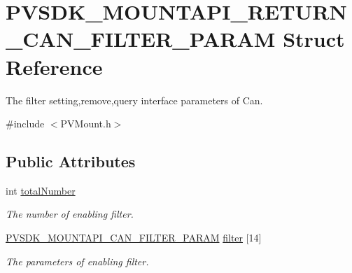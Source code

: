\hypertarget{struct_p_v_s_d_k___m_o_u_n_t_a_p_i___r_e_t_u_r_n___c_a_n___f_i_l_t_e_r___p_a_r_a_m}{}\section{P\+V\+S\+D\+K\+\_\+\+M\+O\+U\+N\+T\+A\+P\+I\+\_\+\+R\+E\+T\+U\+R\+N\+\_\+\+C\+A\+N\+\_\+\+F\+I\+L\+T\+E\+R\+\_\+\+P\+A\+R\+AM Struct Reference}
\label{struct_p_v_s_d_k___m_o_u_n_t_a_p_i___r_e_t_u_r_n___c_a_n___f_i_l_t_e_r___p_a_r_a_m}


The filter setting,remove,query interface parameters of Can.  




{\ttfamily \#include $<$P\+V\+Mount.\+h$>$}

\subsection*{Public Attributes}
\begin{DoxyCompactItemize}
\item 
\mbox{\label{struct_p_v_s_d_k___m_o_u_n_t_a_p_i___r_e_t_u_r_n___c_a_n___f_i_l_t_e_r___p_a_r_a_m_a40275600e00d7753b029d6538826ee22}} 
int \hyperlink{struct_p_v_s_d_k___m_o_u_n_t_a_p_i___r_e_t_u_r_n___c_a_n___f_i_l_t_e_r___p_a_r_a_m_a40275600e00d7753b029d6538826ee22}{total\+Number}
\begin{DoxyCompactList}\small\item\em The number of enabling filter. \end{DoxyCompactList}\item 
\mbox{\label{struct_p_v_s_d_k___m_o_u_n_t_a_p_i___r_e_t_u_r_n___c_a_n___f_i_l_t_e_r___p_a_r_a_m_a6a5a54f9dfeaca19b497a872c44fdca2}} 
\hyperlink{struct_p_v_s_d_k___m_o_u_n_t_a_p_i___c_a_n___f_i_l_t_e_r___p_a_r_a_m}{P\+V\+S\+D\+K\+\_\+\+M\+O\+U\+N\+T\+A\+P\+I\+\_\+\+C\+A\+N\+\_\+\+F\+I\+L\+T\+E\+R\+\_\+\+P\+A\+R\+AM} \hyperlink{struct_p_v_s_d_k___m_o_u_n_t_a_p_i___r_e_t_u_r_n___c_a_n___f_i_l_t_e_r___p_a_r_a_m_a6a5a54f9dfeaca19b497a872c44fdca2}{filter} \mbox{[}14\mbox{]}
\begin{DoxyCompactList}\small\item\em The parameters of enabling filter. \end{DoxyCompactList}\end{DoxyCompactItemize}


